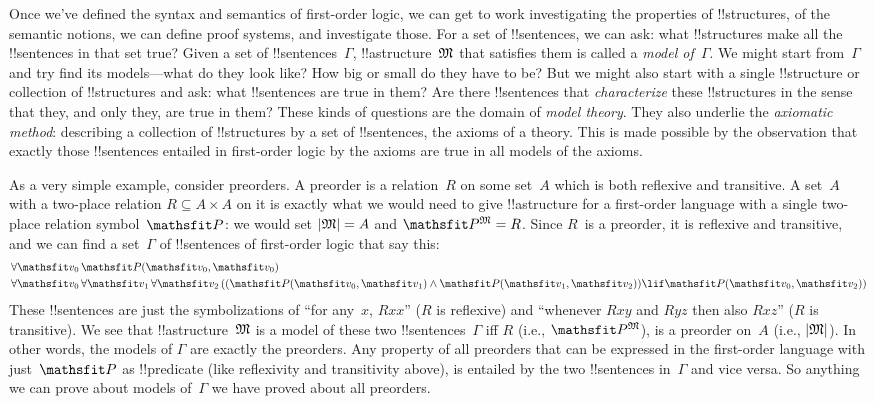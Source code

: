 \documentclass[../../../include/open-logic-section]{subfiles}
\begin{document}


Once we've defined the syntax and semantics of first-order logic, we
can get to work investigating the properties of !!{structure}s, of the
semantic notions, we can define proof systems, and investigate those.
For a set of !!{sentence}s, we can ask: what !!{structure}s make all
the !!{sentence}s in that set true?  Given a set of
!!{sentence}s~$\Gamma$, !!a{structure}~$\Struct{M}$ that satisfies
them is called a \emph{model of~$\Gamma$}.  We might start
from~$\Gamma$ and try find its models---what do they look like? How
big or small do they have to be? But we might also start with a single
!!{structure} or collection of !!{structure}s and ask: what
!!{sentence}s are true in them?  Are there !!{sentence}s that
\emph{characterize} these !!{structure}s in the sense that they, and
only they, are true in them? These kinds of questions are the domain
of \emph{model theory}.  They also underlie the \emph{axiomatic
method}: describing a collection of !!{structure}s by a set of
!!{sentence}s, the axioms of a theory. This is made possible by the
observation that exactly those !!{sentence}s entailed in first-order
logic by the axioms are true in all models of the axioms.

As a very simple example, consider preorders. A preorder is a
relation~$R$ on some set~$A$ which is both reflexive and transitive.
A set~$A$ with a two-place relation $R \subseteq A \times A$ on it is
exactly what we would need to give !!a{structure} for a first-order
language with a single two-place relation symbol~$\Obj P$: we would
set $\Domain{M} = A$ and $\Assign{\Obj P}{M} = R$.  Since $R$~is a
preorder, it is reflexive and transitive, and we can find a
set~$\Gamma$ of !!{sentence}s of first-order logic that say this:
\begin{align*}
  & \lforall[\Obj v_0][\Atom{\Obj P}{\Obj v_0,\Obj v_0}]\\
  & \lforall[\Obj v_0][\lforall[\Obj v_1][\lforall[\Obj v_2][((\Atom{\Obj P}{\Obj v_0,\Obj v_1} \land \Atom{\Obj P}{\Obj v_1,\Obj v_2}) \lif \Atom{\Obj P}{\Obj v_0,\Obj v_2})]]]
\end{align*}
These !!{sentence}s are just the symbolizations of ``for any~$x$,
$Rxx$'' ($R$ is reflexive) and ``whenever $Rxy$ and $Ryz$ then also
$Rxz$'' ($R$ is transitive). We see that !!a{structure}~$\Struct{M}$
is a model of these two !!{sentence}s~$\Gamma$ iff $R$ (i.e.,
$\Assign{\Obj P}{M}$), is a preorder on~$A$ (i.e., $\Domain{M}$). In
other words, the models of $\Gamma$ are exactly the preorders. Any
property of all preorders that can be expressed in the first-order
language with just~$\Obj P$ as !!{predicate} (like reflexivity and
transitivity above), is entailed by the two !!{sentence}s in~$\Gamma$
and vice versa.  So anything we can prove about models of~$\Gamma$ we
have proved about all preorders.
\end{document}
